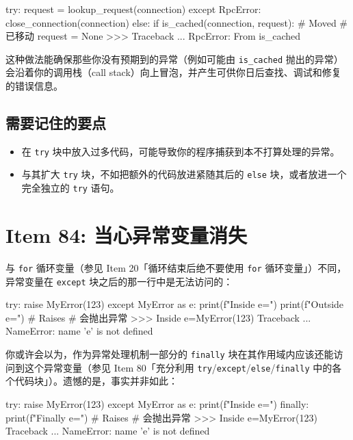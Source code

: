 \begin{codebox}[python]
try:
    request = lookup_request(connection)
except RpcError:
    close_connection(connection)
else:
    if is_cached(connection, request):  # Moved
        # 已移动
        request = None
>>>
Traceback ...
RpcError: From is_cached
\end{codebox}

这种做法能确保那些你没有预期到的异常（例如可能由 \texttt{is\_cached} 抛出的异常）会沿着你的调用栈（call stack）向上冒泡，并产生可供你日后查找、调试和修复的错误信息。

\subsection{需要记住的要点}

\begin{itemize}
\item 在 \texttt{try} 块中放入过多代码，可能导致你的程序捕获到本不打算处理的异常。
\item 与其扩大 \texttt{try} 块，不如把额外的代码放进紧随其后的 \texttt{else} 块，或者放进一个完全独立的 \texttt{try} 语句。
\end{itemize}

\section{Item 84: 当心异常变量消失}

与 \texttt{for} 循环变量（参见 Item 20「循环结束后绝不要使用 \texttt{for} 循环变量」）不同，异常变量在 \texttt{except} 块之后的那一行中是无法访问的：

\begin{codebox}[python]
try:
    raise MyError(123)
except MyError as e:
    print(f"Inside {e=}")
print(f"Outside {e=}")  # Raises
# 会抛出异常
>>>
Inside e=MyError(123)
Traceback ...
NameError: name 'e' is not defined
\end{codebox}

你或许会以为，作为异常处理机制一部分的 \texttt{finally} 块在其作用域内应该还能访问到这个异常变量（参见 Item 80「充分利用 \texttt{try}/\texttt{except}/\texttt{else}/\texttt{finally} 中的各个代码块」）。遗憾的是，事实并非如此：

\begin{codebox}[python]
try:
    raise MyError(123)
except MyError as e:
    print(f"Inside {e=}")
finally:
    print(f"Finally {e=}")  # Raises
# 会抛出异常
>>>
Inside e=MyError(123)
Traceback ...
NameError: name 'e' is not defined
\end{codebox}

